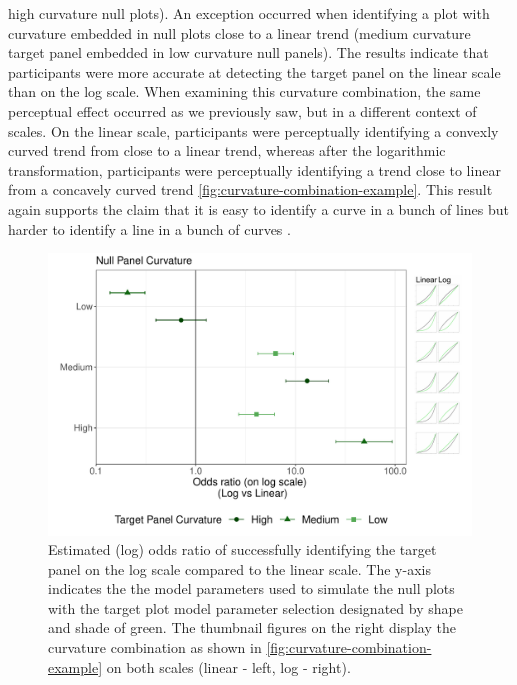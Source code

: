 \documentclass[12pt]{article}
\begin{document}
high curvature null plots). An exception occurred when identifying a
plot with curvature embedded in null plots close to a linear trend
(medium curvature target panel embedded in low curvature null panels).
The results indicate that participants were more accurate at detecting
the target panel on the linear scale than on the log scale. When
examining this curvature combination, the same perceptual effect
occurred as we previously saw, but in a different context of scales. On
the linear scale, participants were perceptually identifying a convexly
curved trend from close to a linear trend, whereas after the logarithmic
transformation, participants were perceptually identifying a trend close
to linear from a concavely curved trend
\cref{fig:curvature-combination-example}. This result again supports the
claim that it is easy to identify a curve in a bunch of lines but harder
to identify a line in a bunch of curves \citep{best_perception_2007}.

\begin{figure}[tbp]

{\centering \includegraphics[width=\linewidth,]{logarithmic-lineups_files/figure-latex/odds-ratio-plot-1} 

}

\caption[Lineups log(odds) results]{Estimated (log) odds ratio of successfully identifying the target panel on the log scale compared to the linear scale. The y-axis indicates the the model parameters used to simulate the null plots with the target plot model parameter selection designated by shape and shade of green. The thumbnail figures on the right display the curvature combination as shown in \cref{fig:curvature-combination-example} on both scales (linear - left, log - right).}\label{fig:odds-ratio-plot}
\end{figure}
\end{document}
